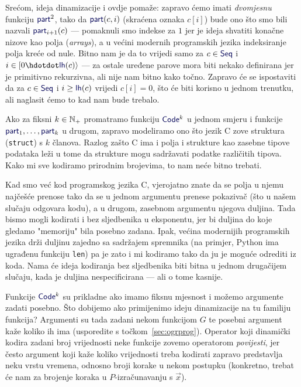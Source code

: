 Srećom, ideja dinamizacije i ovdje pomaže: zapravo ćemo imati \emph{dvomjesnu} funkciju $\f{part}^2$, tako da $\f{part}(c,i)$ (skraćena oznaka $c[i]$) bude ono što smo bili nazvali $\f{part}_{i+1}(c)$ --- pomaknuli smo indekse za $1$ jer je ideja shvatiti konačne nizove kao polja (\emph{arrays}), a u većini modernih programskih jezika indeksiranje polja kreće od nule. Bitno nam je da to vrijedi samo za $c\in\f{Seq}$ i $i\in[0\dd \f{lh}(c)\rangle$ --- za ostale uređene parove mora biti nekako definirana jer je primitivno rekurzivna, ali nije nam bitno kako točno. Zapravo će se ispostaviti da za $c\in\f{Seq}$ i $i\ge\f{lh}(c)$ vrijedi $c[i]=0$, što će biti korisno u jednom trenutku, ali naglasit ćemo to kad nam bude trebalo.

\begin{napomena}[{name=[strukture kao konačni nizovi fiksne duljine]}]
    Ako za fiksni $k\in{\mathbb N}_+$ promatramo funkciju $\f{Code}^k$ u jednom smjeru i funkcije $\f{part}_1,\dotsc,\f{part}_k$ u drugom, zapravo modeliramo ono što jezik C zove struktura (\texttt{struct}) s $k$ članova. Razlog zašto C ima i polja i strukture kao zasebne tipove podataka leži u tome da strukture mogu sadržavati podatke različitih tipova. Kako mi sve kodiramo prirodnim brojevima, to nam neće bitno trebati. %
\end{napomena}

Kad smo već kod programskog jezika C, vjerojatno znate da se polja u njemu najčešće prenose tako da se u jednom argumentu prenese pokazivač (što u našem slučaju odgovara kodu), a u drugom, zasebnom argumentu njegova duljina. Tada bismo mogli kodirati i bez sljedbenika u eksponentu, jer bi duljina do koje gledamo "memoriju" bila posebno zadana. Ipak, većina modernijih programskih jezika drži duljinu zajedno sa sadržajem spremnika (na primjer, Python ima ugrađenu funkciju \texttt{len}) pa je zato i mi kodiramo tako da ju je moguće odrediti iz koda. Nama će ideja kodiranja bez sljedbenika biti bitna u jednom drugačijem slučaju, kada je duljina nespecificirana --- ali o tome kasnije.

Funkcije $\f{Code}^k$ su prikladne ako imamo fiksnu mjesnost i možemo argumente zadati posebno. Što dobijemo ako primijenimo ideju dinamizacije na tu familiju funkcija? Argumenti su tada zadani nekom funkcijom $G$ te posebni argument kaže koliko ih ima (usporedite s točkom~\ref{sec:ogrprog}). Operator koji dinamički kodira zadani broj vrijednosti neke funkcije zovemo operatorom \emph{povijesti}, jer često argument koji kaže koliko vrijednosti treba kodirati zapravo predstavlja neku vrstu vremena, odnosno broji korake u nekom postupku (konkretno, trebat će nam za brojenje koraka u $P$-izračunavanju s $\vec x$).

